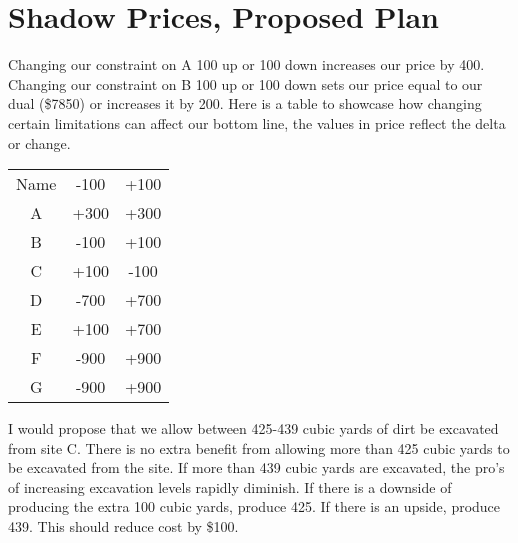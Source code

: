 \documentclass[12pt]{article} %
\begin{document}
\section*{Shadow Prices, Proposed Plan}
Changing our constraint on A 100 up or 100 down increases our price by 400. Changing our constraint on B 100 up or 100 down sets our price equal to our dual (\$7850) or increases it by 200. Here is a table to showcase how changing certain limitations can affect our bottom line, the values in price reflect the delta or change.

\begin{center}
\begin{tabular}{ |c|c|c| }
 \hline
  Name & -100 & +100 \\
  A & +300 & +300  \\
  B & -100 & +100  \\
  C & +100 & -100  \\
  D & -700 & +700  \\
  E & +100 & +700  \\
  F & -900 & +900  \\
  G & -900 & +900  \\
 \hline
\end{tabular}
\end{center}

I would propose that we allow between 425-439 cubic yards of dirt be excavated from site C. There is no extra benefit from allowing more than 425 cubic yards to be excavated from the site. If more than 439 cubic yards are excavated, the pro's of increasing excavation levels rapidly diminish. If there is a downside of producing the extra 100 cubic yards, produce 425. If there is an upside, produce 439. This should reduce cost by \$100.


 
\end{document}

